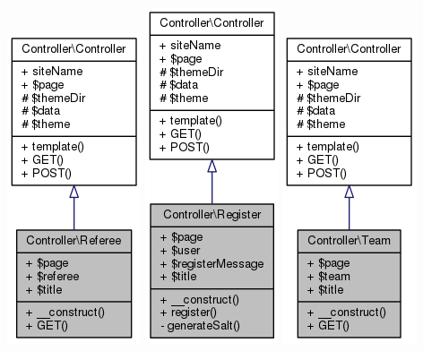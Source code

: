 \documentclass[11pt]{article}
\begin{document}
\includegraphics[scale=0.4]{UML_Controller_1_1Referee.png}
\includegraphics[scale=0.4]{UML_Controller_1_1Register.png}
\includegraphics[scale=0.4]{UML_Controller_1_1Team.png}
\end{document}
